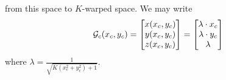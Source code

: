 \documentclass[newpage,hints,handout,12pt,noauthor,nooutcomes]{ximera}
\begin{document}
\begin{center}
\end{center}
from this space to $K$-warped space. We may write
\[
\mathcal{G}_c(x_c,y_c) = 
\begin{bmatrix}
x(x_c,y_c)  \\
y(x_c,y_c)  \\
z(x_c,y_c)  
\end{bmatrix}
=
\begin{bmatrix}
\lambda \cdot x_c  \\
\lambda \cdot y_c  \\
\lambda  
\end{bmatrix}
\]
where $\lambda =  \frac{1}{\sqrt{K\left(x_c^2 + y_c^2\right)+1}}$.
\end{document}

